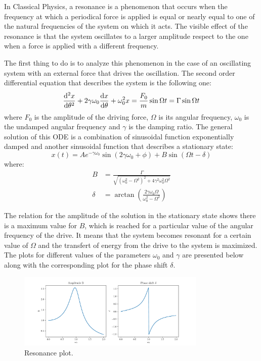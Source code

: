 In Classical Physics, a resonance is a phenomenon that occurs when the frequency at which a periodical force is applied is equal or nearly equal to one of the natural frequencies of the system on which it acts. The visible effect of the resonance is that the system oscillates to a larger amplitude respect to the one when a force is applied with a different frequency.

The first thing to do is to analyze this phenomenon in the case of an oscillating system with an external force that drives the oscillation. The second order differential equation that describes the system is the following one:
\begin{equation}
	\displaystyle \frac{\mathrm{d}^{2} x}{\mathrm{d} {\theta}^{2}} + 2 \gamma \omega_{0} \displaystyle \frac{\mathrm{d} x}{\mathrm{d} \theta} + \omega_{0}^2 x = \frac{F_0}{m} \sin{\Omega t} = \Gamma \sin{\Omega t}
\end{equation}
where $F_{0}$ is the amplitude of the driving force, $\Omega$ is its angular frequency, $\omega_{0}$ is the undamped angular frequency and $\gamma$ is the damping ratio. The general solution of this ODE is a combination of sinusoidal function exponentially damped and another sinusoidal function that describes a stationary state:
\begin{equation}
	x(t) = A e^{-\gamma \omega_{0}} \sin{(2\gamma \omega_{0} + \phi)} + B \sin{(\Omega t - \delta)}
\end{equation}
where:
\begin{align}
	B &= \frac{\Gamma}{\sqrt{(\omega_{0}^2 - \Omega^2)^2 + 4 \gamma^2 \omega_{0}^2 \Omega^2}}	\\
	\delta &= \arctan{\left( \frac{2 \gamma \omega_{0} \Omega}{\omega_{0}^2 - \Omega^2} \right)}
\end{align}

The relation for the amplitude of the solution in the stationary state shows there is a maximum value for $B$, which is reached for a particular value of the angular frequency of the drive. It means that the system becomes resonant for a certain value of $\Omega$ and the transfert of energy from the drive to the system is maximized. The plots for different values of the parameters $\omega_{0}$ and $\gamma$ are presented below along with the corresponding plot for the phase shift $\delta$.

\begin{figure}[H]
	\begin{center}
		\includegraphics[width=0.8\textwidth]{Python/LHC/resonance.pdf}
		\caption{Resonance plot.}
		\label{fig:RESONANCE_PLOT}
	\end{center}
\end{figure}

